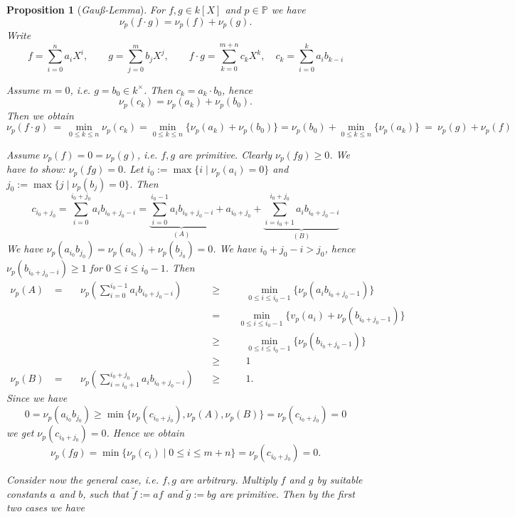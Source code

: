 \documentclass[11pt]{book}
\newtheorem{proposition}[theorem]{Proposition}
\theoremstyle{nonumberbreak}
\newenvironment{pr}[1][]{\ifthenelse{\equal{#1}{}}{\proof}{\proof[#1]}\rm}{\endproof}
\begin{document}
\begin{spacing}{1.3}
\begin{proposition}[\rm \it Gauß-Lemma]
For $f,g \in k[X]$ and $p \in \mathbb{P}$ we have 
$$\nu_p(f\cdot g)=\nu_p(f) + \nu_p(g).$$
\begin{pr}
Write 
$$f=\sum_{i=0}^n a_i X^{i}, \qquad g=\sum_{j=0}^m b_j X^{j}, \qquad f \cdot g = \sum_{k=0}^{m+n}c_k X^{k}, \quad c_k=\sum_{i=0}^k a_i b_{k-i}$$
\begin{compactitem}
\item[\textbf{case 1}] Assume $m=0$, i.e. $g=b_0 \in k^{\times}$. Then $c_k=a_k \cdot b_0$, hence 
$$\nu_p(c_k)=\nu_p(a_k) + \nu_p(b_0).$$
Then we obtain
$$\nu_p(f \cdot g) \  = \ \min_{0\leqslant k \leqslant n} \nu_p(c_k)=\min_{0 \leqslant k \leqslant n}\{\nu_p(a_k)+\nu_p(b_0)\}=\nu_p(b_0)+\min_{0\leqslant k \leqslant n}\{\nu_p(a_k)\}\ = \ \nu_p(g)+\nu_p(f)$$
\item[\textbf{case 2}] Assume $\nu_p(f)=0=\nu_p(g)$, i.e. $f,g$ are primitive. Clearly $\nu_p(fg)\geqslant 0$. We have to show: $\nu_p(fg)=0$.
Let $i_0:=\max\{i \mid \nu_p(a_i)=0\}$ and $j_0:= \max\{j \mid \nu_p(b_j)=0\}$. Then
$$c_{i_0+j_0}=\sum_{i=0}^{i_0+j_0}a_i b_{i_0+j_0-i}=\underbrace{\sum_{i=0}^{i_0-1} a_i b_{i_0+j_0-i}}_{(A)} + a_{i_0+j_0}+ \underbrace{\sum_{i=i_0+1}^{i_0+j_0} a_i b_{i_0+j_0-i}}_{(B)}$$
We have $\nu_p(a_{i_0}b_{j_0})=\nu_p(a_{i_0})+\nu_p(b_{j_0})=0$.
We have $i_0+j_0-i>j_0$, hence $\nu_p(b_{i_0+j_0-i}) \geqslant 1$ for $0 \leqslant i \leqslant i_0-1$. Then 
\begin{alignat*}{11}
\nu_p(A)\ &=&&\ \nu_p\left(\sum_{i=0}^{i_0-1}a_i b_{i_0+j_0-i}\right) \quad &&\geqslant && \quad \min_{0 \leqslant i \leqslant i_0-1} \{\nu_p(a_ib_{i_0+j_0-1})\} \\ 
&&&&&=&& \ \min_{0 \leqslant i \leqslant i_0-1} \{v_p(a_i)+\nu_p(b_{i_0+j_0-1})\}\\
&&&\quad &&\geqslant&&\quad \min_{0 \leqslant i \leqslant i_0-1}\{\nu_p(b_{i_0+j_0-1})\}\\
&&&&&\geqslant&& \quad 1\\
\nu_p(B)\ &=&&\ \nu_p\left(\sum_{i=i_0+1}^{i_0+j_0} a_i b_{i_0+j_0-i}\right) \ &&\geqslant&& \quad 1.
\end{alignat*}
Since we have 
$$0=\nu_p(a_{i_0}b_{j_0})\geqslant \min\{\nu_p(c_{i_0+j_0}), \nu_p(A), \nu_p(B)\}=\nu_p(c_{i_0+j_0})=0$$
we get $\nu_p(c_{i_0+j_0})=0$. Hence we obtain
$$\nu_p(fg)=\min\{\nu_p(c_i) \mid 0 \leqslant i \leqslant m+n \}=\nu_p(c_{i_0+j_0})=0.$$
\item[\textbf{case 3}] Consider now the general case, i.e. $f,g$ are arbitrary.
Multiply $f$ and $g$ by suitable constants $a$ and $b$, such that $\tilde{f}:=af$ and $\tilde{g}:=bg$ are primitive. Then by the first two cases we have

\end{compactitem}
\end{pr}
\end{proposition}
\end{spacing}
\end{document}
